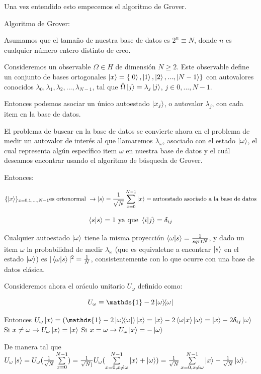 \documentclass[11pt, spanish]{report}
\begin{document}
Una vez entendido esto empecemos el algoritmo de Grover.

Algoritmo de Grover:

Asumamos que el tamaño de nuestra base de datos es $2^n \equiv N$, donde $n$ es cualquier número entero distinto de creo.

Consideremos un observable $\Omega \in H$ de dimensión $N \geq 2$. Este
observable define un conjunto de bases ortogonales $\ket{x} = \{\ket{0},
\ket{1}, \ket{2},...,\ket{N-1}\}$ con autovalores conocidos $\lambda_0,
\lambda_1, \lambda_2,..., \lambda_{N-1}$, tal que $\hat{\Omega} \ket{j} =
\lambda_j \ket{j}$, $j \in {0,...,N-1}$.

Entonces podemos asociar un único autoestado $\ket{x_j}$, o autovalor
$\lambda_j$, con cada item en la base de datos.

El problema de buscar en la base de datos se convierte ahora en el problema de
medir un autovalor de interés al que llamaremos $\lambda_\omega$, asociado con
el estado $\ket{\omega}$, el cual representa algún específico item $\omega$ en
nuestra base de datos y el cuál deseamos encontrar usando el algoritmo de
búsqueda de Grover.

Entonces:

$$\{\ket{x}\}_{x=0,1,...,N-1} \text{es ortonormal }\rightarrow \ket{s} =
\frac{1}{\sqrt{N}} \sum\limits_{x=0}^{N-1} \ket{x} = \text{autoestado asociado a
  la base de datos}$$

$$\braket{s}{s} = 1 \text{ ya que } \braket{i}{j} = \delta_{ij}$$

Cualquier autoestado $\ket{\omega}$ tiene la misma proyección
$\braket{\omega}{s} = \frac{1}{sqrt{N}}$, y dado un item $\omega$ la
probabilidad de medir $\lambda_\omega$ (que es equivaletne a encontrar $\ket{s}$
en el estado $\ket{\omega}$) es $|\braket{\omega}{s}|^2 = \frac{1}{N}$,
consistentemente con lo que ocurre con una base de datos clásica.

Consideremos ahora el oráculo unitario $U_\omega$ definido como:

$$U_\omega \equiv \mathds{1} - 2\ketbra{\omega}{\omega}$$

Entonces $U_\omega \ket{x} = (\mathds{1} - 2\ketbra{\omega}{\omega}) \ket{x} =
\ket{x} - 2 \braket{\omega}{x} \ket{\omega} = \ket{x} - 2 \delta_{ij} \ket{\omega}$
 Si $x \neq \omega \rightarrow U_\omega \ket{x} = \ket{x}$ 
 Si $x = \omega \rightarrow U_\omega \ket{x} = -\ket{\omega}$ 

De manera tal que $U_\omega \ket{s} = U_\omega (\frac{1}{\sqrt{N}}
\sum\limits_{x = 0}^{N-1}) = \frac{1}{\sqrt{N})} U_\omega (\sum\limits_{x=0,
  x\neq\omega}^{N-1} \ket{x} + \ket{\omega}) =
\frac{1}{\sqrt{N}}\sum\limits_{x=0, x\neq\omega}^{N-1} \ket{x} -
\frac{1}{\sqrt{N}} \ket{\omega}$.
\end{document}
